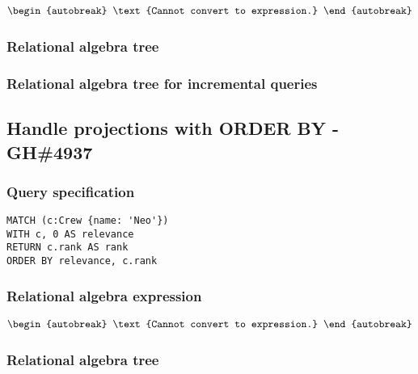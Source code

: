 \begin{align*}
\begin{autobreak}
\text{Cannot convert to expression.}
\end{autobreak}
\end{align*}

\subsubsection*{Relational algebra tree}


\subsubsection*{Relational algebra tree for incremental queries}


\subsection{Handle projections with ORDER BY - GH\#4937}

\subsubsection*{Query specification}

\begin{lstlisting}
MATCH (c:Crew {name: 'Neo'})
WITH c, 0 AS relevance
RETURN c.rank AS rank
ORDER BY relevance, c.rank
\end{lstlisting}

\subsubsection*{Relational algebra expression}

\begin{align*}
\begin{autobreak}
\text{Cannot convert to expression.}
\end{autobreak}
\end{align*}

\subsubsection*{Relational algebra tree}


